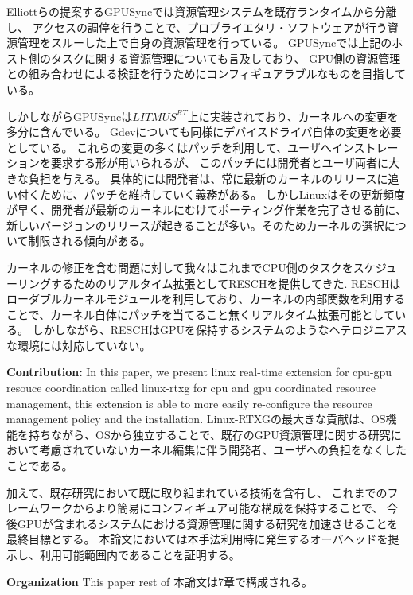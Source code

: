 Elliottらの提案するGPUSync\cite{elliott:gpusync13}\cite{elliott:explor14}では資源管理システムを既存ランタイムから分離し、
アクセスの調停を行うことで、プロプライエタリ・ソフトウェアが行う資源管理をスルーした上で自身の資源管理を行っている。
GPUSyncでは上記のホスト側のタスクに関する資源管理についても言及しており、
GPU側の資源管理との組み合わせによる検証を行うためにコンフィギュアラブルなものを目指している。

しかしながらGPUSyncは$LITMUS^{RT}$\cite{litmus}上に実装されており、カーネルへの変更を多分に含んでいる。
Gdevについても同様にデバイスドライバ自体の変更を必要としている。
これらの変更の多くはパッチを利用して、ユーザへインストレーションを要求する形が用いられるが、
このパッチには開発者とユーザ両者に大きな負担を与える。
具体的には開発者は、常に最新のカーネルのリリースに追い付くために、パッチを維持していく義務がある。
しかしLinuxはその更新頻度が早く、開発者が最新のカーネルにむけてポーティング作業を完了させる前に、新しいバージョンのリリースが起きることが多い。そのためカーネルの選択について制限される傾向がある。

カーネルの修正を含む問題に対して我々はこれまでCPU側のタスクをスケジューリングするためのリアルタイム拡張としてRESCH\cite{kato:}を提供してきた.
RESCHはローダブルカーネルモジュールを利用しており、カーネルの内部関数を利用することで、カーネル自体にパッチを当てること無くリアルタイム拡張可能としている。
しかしながら、RESCHはGPUを保持するシステムのようなヘテロジニアスな環境には対応していない。

\textbf{Contribution:}
In this paper, we present linux real-time extension for cpu-gpu resouce coordination called linux-rtxg for cpu and gpu coordinated resource management, this extension is able to more easily re-configure the resource management policy and the installation.
Linux-RTXGの最大きな貢献は、OS機能を持ちながら、OSから独立することで、既存のGPU資源管理に関する研究において考慮されていないカーネル編集に伴う開発者、ユーザへの負担をなくしたことである。

加えて、既存研究において既に取り組まれている技術を含有し、
これまでのフレームワークからより簡易にコンフィギュア可能な構成を保持することで、
今後GPUが含まれるシステムにおける資源管理に関する研究を加速させることを最終目標とする。
本論文においては本手法利用時に発生するオーバヘッドを提示し、利用可能範囲内であることを証明する。


\textbf{Organization}
This paper rest of 
本論文は7章で構成される。
